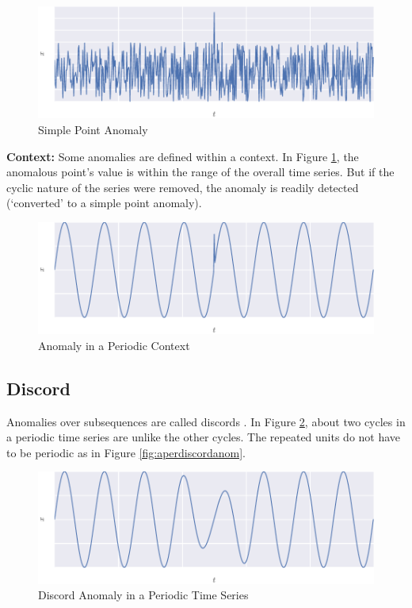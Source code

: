 \begin{figure}[H]
  \centering
  \includegraphics{figs/trivial.pdf}
  \caption{Simple Point Anomaly}
\end{figure}


\textbf{Context:} Some anomalies are defined within a context. In Figure \ref{fig:contextanom}, the anomalous point's value is within the range of the overall time series. But if the cyclic nature of the series were removed, the anomaly is readily detected (`converted' to a simple point anomaly).

\begin{figure}[H]
  \centering
  \includegraphics{figs/context.pdf}
  \caption{Anomaly in a Periodic Context}
  \label{fig:contextanom}
\end{figure}


\subsection{Discord}

Anomalies over subsequences are called discords \cite{Cheboli2010}. In Figure \ref{fig:perdiscordanom}, about two cycles in a periodic time series are unlike the other cycles. The repeated units do not have to be periodic as in Figure \ref{fig:aperdiscordanom}. 

\begin{figure}[H]
  \centering
  \includegraphics{figs/discord_per.pdf}
  \caption{Discord Anomaly in a Periodic Time Series}
  \label{fig:perdiscordanom}
\end{figure}

